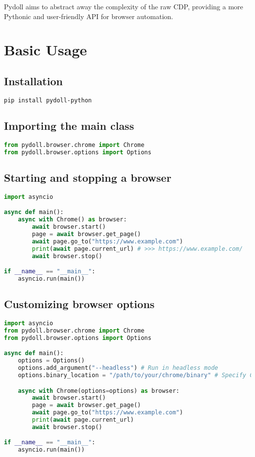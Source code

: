 \documentclass{article}
\begin{document}
\noindent Pydoll aims to abstract away the complexity of the raw CDP, providing a more Pythonic and user-friendly API for browser automation.

\section{Basic Usage}

\subsection{Installation}

\begin{lstlisting}[language=bash]
pip install pydoll-python
\end{lstlisting}

\subsection{Importing the main class}

\begin{lstlisting}[language=Python]
from pydoll.browser.chrome import Chrome
from pydoll.browser.options import Options
\end{lstlisting}

\subsection{Starting and stopping a browser}

\begin{lstlisting}[language=Python]
import asyncio

async def main():
    async with Chrome() as browser:
        await browser.start()
        page = await browser.get_page()
        await page.go_to("https://www.example.com")
        print(await page.current_url) # >>> https://www.example.com/
        await browser.stop()

if __name__ == "__main__":
    asyncio.run(main())
\end{lstlisting}

\subsection{Customizing browser options}

\begin{lstlisting}[language=Python]
import asyncio
from pydoll.browser.chrome import Chrome
from pydoll.browser.options import Options

async def main():
    options = Options()
    options.add_argument("--headless") # Run in headless mode
    options.binary_location = "/path/to/your/chrome/binary" # Specify Chrome binary path

    async with Chrome(options=options) as browser:
        await browser.start()
        page = await browser.get_page()
        await page.go_to("https://www.example.com")
        print(await page.current_url)
        await browser.stop()

if __name__ == "__main__":
    asyncio.run(main())
\end{lstlisting}
\end{document}

